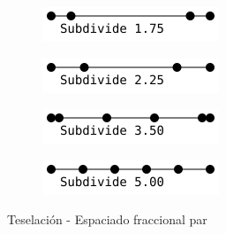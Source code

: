 \begin{figure}
	\centering
	\begin{subfigure}{.45\textwidth}
			\includegraphics[width=\textwidth]{figures/even1.png}	
	\end{subfigure}
	\hfill
	\begin{subfigure}{.45\textwidth}
			\includegraphics[width=\textwidth]{figures/even2.png}	
	\end{subfigure}
	\newline
	\begin{subfigure}{.45\textwidth}
			\includegraphics[width=\textwidth]{figures/even3.png}	
	\end{subfigure}
	\hfill
	\begin{subfigure}{.45\textwidth}
			\includegraphics[width=\textwidth]{figures/even4.png}	
	\end{subfigure}
	\caption{Teselación - Espaciado fraccional par}
	\label{fig3.3}
\end{figure}

